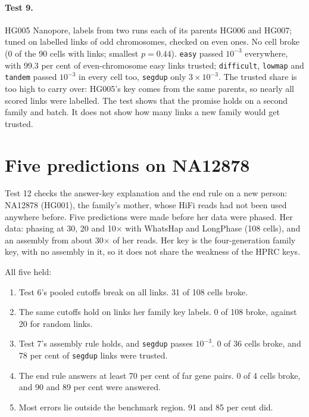 \documentclass[11pt]{article}
\newcommand{\grp}[1]{\texttt{#1}}
\begin{document}
\paragraph{Test 9.} HG005 Nanopore, labels from two runs each of its parents
HG006 and HG007; tuned on labelled links of odd chromosomes, checked on even
ones. No cell broke (0 of the 90 cells with links; smallest $p=0.44$).
\grp{easy} passed $10^{-3}$ everywhere, with 99.3 per cent of even-chromosome
easy links trusted; \grp{difficult}, \grp{lowmap} and \grp{tandem} passed
$10^{-3}$ in every cell too, \grp{segdup} only $3\times10^{-3}$. The
trusted share is too high to carry over: HG005's key comes from the same
parents, so nearly all scored links were labelled. The test shows that the
promise holds on a second family and batch. It does not show how many links
a new family would get trusted.

\section{Five predictions on NA12878}\label{sec:na12878}

Test 12 checks the answer-key explanation and the end rule on a new
person: NA12878 (HG001), the family's mother, whose HiFi reads had not been
used anywhere before. Five predictions were made before her data were
phased. Her data: phasing at 30, 20 and 10$\times$ with WhatsHap and
LongPhase (108 cells), and an assembly from about 30$\times$ of her reads.
Her key is the four-generation family key, with no assembly in it, so it
does not share the weakness of the HPRC keys.

All five held:

\begin{enumerate}
\item Test 6's pooled cutoffs break on all links. 31 of 108 cells broke.
\item The same cutoffs hold on links her family key labels. 0 of 108 broke,
  against 20 for random links.
\item Test 7's assembly rule holds, and \grp{segdup} passes $10^{-3}$. 0 of
  36 cells broke, and 78 per cent of \grp{segdup} links were trusted.
\item The end rule answers at least 70 per cent of far gene pairs. 0 of 4
  cells broke, and 90 and 89 per cent were answered.
\item Most errors lie outside the benchmark region. 91 and 85 per cent did.
\end{enumerate}
\end{document}
